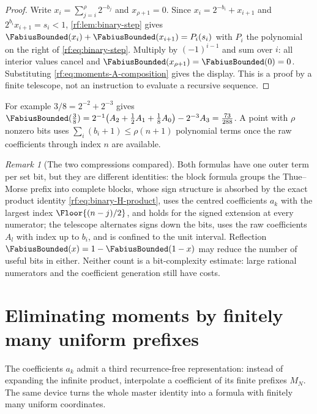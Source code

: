 \documentclass[11pt,oneside]{article}
\theoremstyle{plain}
\theoremstyle{definition}
\theoremstyle{remark}
\newtheorem{remark}[theorem]{Remark}
\newcommand{\Fb}{\FabiusBounded}            %
\begin{document}
\begin{proof}
Write $x_{i}=\sum_{j=i}^{\rho}2^{-b_{j}}$ and $x_{\rho+1}=0$.  Since
$x_{i}=2^{-b_{i}}+x_{i+1}$ and $2^{b_{i}}x_{i+1}=s_{i}<1$,
\cref{rf:lem:binary-step} gives $\Fb(x_{i})+\Fb(x_{i+1})=P_{i}(s_{i})$ with
$P_{i}$ the polynomial on the right of \cref{rf:eq:binary-step}.  Multiply
by $(-1)^{i-1}$ and sum over $i$: all interior values cancel and
$\Fb(x_{\rho+1})=\Fb(0)=0$.  Substituting
\cref{rf:eq:moments-A-composition} gives the display.  This is a proof by a
finite telescope, not an instruction to evaluate a recursive sequence.
\end{proof}

For example $3/8=2^{-2}+2^{-3}$ gives
$\Fb(\tfrac38)=2^{-1}\bigl(A_{2}+\tfrac12A_{1}+\tfrac18A_{0}\bigr)-2^{-3}A_{3}=\tfrac{73}{288}$.
A point with $\rho$ nonzero bits uses $\sum_{i}(b_{i}+1)\le\rho(n+1)$
polynomial terms once the raw coefficients through index $n$ are available.

\begin{remark}[The two compressions compared]
\label{rf:rmk:binary-compare}
Both formulas have one outer term per set bit, but they are different
identities: the block formula groups the Thue--Morse prefix into complete
blocks, whose sign structure is absorbed by the exact product identity
\cref{rf:eq:binary-H-product}, uses the centred coefficients $a_{k}$ with
the largest index $\Floor{(n-j)/2}$, and holds for the signed extension at
every numerator; the telescope alternates signs down the bits, uses the raw
coefficients $A_{l}$ with index up to $b_{i}$, and is confined to the unit
interval.  Reflection $\Fb(x)=1-\Fb(1-x)$ may reduce the number of useful
bits in either.  Neither count is a bit-complexity estimate: large rational
numerators and the coefficient generation still have costs.
\end{remark}

\section{Eliminating moments by finitely many uniform prefixes}
\label{rf:sec:prefix}

The coefficients $a_{k}$ admit a third recurrence-free representation:
instead of expanding the infinite product, interpolate a coefficient of its
finite prefixes $M_{N}$.  The same device turns the whole master identity
into a formula with finitely many uniform coordinates.
\end{document}
